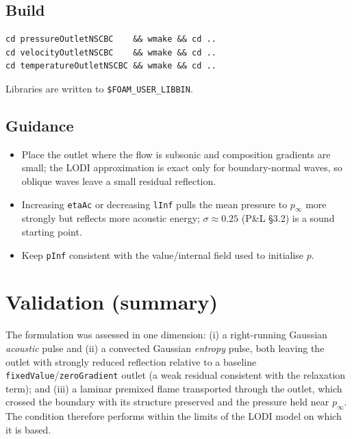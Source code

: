 \documentclass[11pt,a4paper]{article}
\newcommand{\code}[1]{\texttt{#1}}
\newif\ifvtwo
\begin{document}
\subsection{Build}
\ifvtwo
\begin{lstlisting}
./Allwmake        # builds the three libpressureOutletNSCBCNew.so etc.
\end{lstlisting}
\else
\begin{lstlisting}
cd pressureOutletNSCBC    && wmake && cd ..
cd velocityOutletNSCBC    && wmake && cd ..
cd temperatureOutletNSCBC && wmake && cd ..
\end{lstlisting}
\fi
Libraries are written to \code{\$FOAM\_USER\_LIBBIN}.

\subsection{Guidance}
\begin{itemize}\setlength\itemsep{1pt}
  \item Place the outlet where the flow is subsonic and composition gradients
        are small; the LODI approximation is exact only for boundary-normal
        waves, so oblique waves leave a small residual reflection.
  \item Increasing \code{etaAc} or decreasing \code{lInf} pulls the mean
        pressure to $p_\infty$ more strongly but reflects more acoustic energy;
        $\sigma\approx0.25$ (P\&L \S3.2) is a sound starting point.
  \item Keep \code{pInf} consistent with the value/internal field used to
        initialise $p$.
\end{itemize}

\section{Validation (summary)}
The formulation was assessed in one dimension: (i) a right-running Gaussian
\emph{acoustic} pulse and (ii) a convected Gaussian \emph{entropy} pulse, both
leaving the outlet with strongly reduced reflection relative to a baseline
\code{fixedValue}/\code{zeroGradient} outlet (a weak residual consistent with
the relaxation term); and (iii) a laminar premixed flame transported through
the outlet, which crossed the boundary with its structure preserved and the
pressure held near $p_\infty$. The condition therefore performs within the
limits of the LODI model on which it is based.
\end{document}
